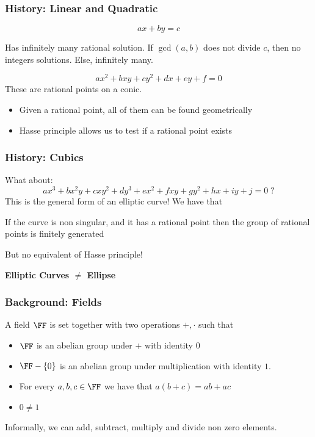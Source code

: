 \documentclass{beamer}
\begin{document}
\begin{frame}
    \frametitle{History: Linear and Quadratic}
    \[ a x + b y = c \]
    \begin{theorem}
        Has infinitely many rational solution. If $\gcd(a, b)$ does not divide $c$, then no integers solutions.
        Else, infinitely many.
    \end{theorem}
    \[ a x^2 + b x y + c y^2  + d x + e y + f = 0 \]
    These are rational points on a conic. 
    \begin{itemize}
        \item Given a rational point, all of them can be found geometrically
        \item Hasse principle allows us to test if a rational point exists
    \end{itemize}

\end{frame}

\begin{frame}
    \frametitle{History: Cubics}
    What about:
    \[ a x^3 + b x^2 y + c x y^2 + d y^3 + e x^2 + f x y + g y^2 + h x + i y + j = 0 \; ? \]
    This is the general form of an elliptic curve!
    We have that 
    \begin{theorem}[Mordell]
        If the curve is non singular, and it has a rational point then the group of rational points is finitely generated
    \end{theorem}
    But no equivalent of Hasse principle!

    \begin{center}
        \textbf{Elliptic Curves $\neq$ Ellipse}
    \end{center}
\end{frame}

\begin{frame}
    \frametitle{Background: Fields}
    \begin{definition}
        A field $\FF$ is set together with two operations $+, \cdot$ such that 
        \begin{itemize}
            \item $\FF$ is an abelian group under $+$ with identity $0$
            \item $\FF - \{ 0 \}$ is an abelian group under multiplication with identity $1$.
            \item For every $a,b,c \in \FF$ we have that $a (b + c) = ab + ac$
            \item $0 \neq 1$
        \end{itemize}
    \end{definition}
    Informally, we can add, subtract, multiply and divide non zero elements.
\end{frame}
\end{document}
